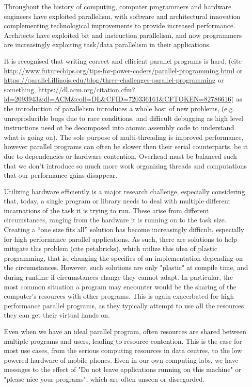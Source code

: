 
Throughout the history of computing, computer programmers and hardware engineers have exploited parallelism, with software and architectural innovation complementing technological improvements to provide increased performance. Architects have exploited bit and instruction parallelism, and now programmers are increasingly exploiting task/data parallelism in their applications.

It is recognised that writing correct and efficient parallel programs is hard, (cite \url{http://www.futurechips.org/tips-for-power-coders/parallel-programming.html} or \url{https://parallel.illinois.edu/blog/three-challenges-parallel-programming} or something, \url{https://dl.acm.org/citation.cfm?id=2093943&dl=ACM&coll=DL&CFID=720336161&CFTOKEN=82786616}) as the introduction of parallelism introduces a whole host of new problems, (e.g. unreproducible bugs due to race conditions, and difficult debugging as high level instructions need ot be decomposed  into atomic assembly code to understand what is going on). The sole purpose of multi-threading is improved performance, however parallel programs can often be slower then their serial counterparts, be it due to dependencies or hardware contention. Overhead must be balanced such that we don't introduce so much more work organizing threads and computations that our performance gains disappear.

Utilizing hardware efficiently is a major research challenge, especially considering that, today, a single program or library needs to deal with multiple different incarnations of the task it is trying to run. These arise from different circumstances, ranging from the hardware it is running on to the task size. Creating a ``one size fits all'' solution has become increasingly difficult, especially for high performance parallel applications. As such, there are solutions to help mitigate this problem (cite petabricks), which utilize this idea of plastic programming, that is, changing the specifics of an implementation depending on the circumstances. However, such solutions are only "plastic" at compile time, and during runtime if circumstances change they cannot adapt. In particular, the most common situation a program may encounter would be the sharing of the computer's resources with other programs. This is again exacerbated for high performance parallel programs, as they typically attempt to use all the resources they can get their virtual hands on.

Even when we have an ideal parallel program, often resources are shared between multiple programs and users, leading to resource contention. This is the case for most use cases, from the serious computing resources in data centres, to the low powered hardware of mobile phones. Even in our own computing labs, we have messages to the effect of "Do not leave applications running on this machine" or "please nice your programs", which are often unseen or disregarded.

